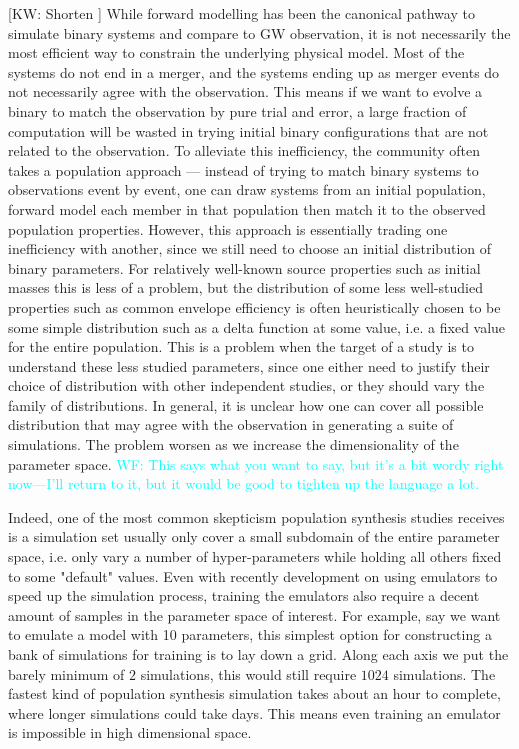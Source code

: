 \documentclass[twocolumn]{aastex631}
\newcommand{\kw}[1]{{\color{rb4}[KW: #1 ]}}
\newcommand{\wf}[1]{\textcolor{cyan}{WF: #1}}
\begin{document}
\kw{Shorten}
While forward modelling has been the canonical pathway to simulate binary systems and compare to GW observation,
it is not necessarily the most efficient way to constrain the underlying physical model.
Most of the systems do not end in a merger, and the systems ending up as merger events do not necessarily agree with the observation.
This means if we want to evolve a binary to match the observation by pure trial and error, a large fraction of computation will be wasted in trying initial binary configurations that are not related to the observation.
To alleviate this inefficiency, the community often takes a population approach --- instead of trying to match binary systems to observations event by event,
one can draw systems from an initial population, forward model each member in that population then match it to the observed population properties.
However, this approach is essentially trading one inefficiency with another, since we still need to choose an initial distribution of binary parameters.
For relatively well-known source properties such as initial masses this is less of a problem,
but the distribution of some less well-studied properties such as common envelope efficiency is often heuristically chosen to be some simple distribution such as a delta function at some value, i.e. a fixed value for the entire population.
This is a problem when the target of a study is to understand these less studied parameters, since one either need to justify their choice of distribution with other independent studies,
or they should vary the family of distributions.
In general, it is unclear how one can cover all possible distribution that may agree with the observation in generating a suite of simulations.
The problem worsen as we increase the dimensionality of the parameter space.
\wf{This says what you want to say, but it's a bit wordy right now---I'll return to it, but it would be good to tighten up the language a lot.}

Indeed, one of the most common skepticism population synthesis studies receives is a simulation set usually only cover a small subdomain of the entire parameter space,
i.e. only vary a number of hyper-parameters while holding all others fixed to some "default" values.
Even with recently development on using emulators to speed up the simulation process, training the emulators also require a decent amount of samples in the parameter space of interest.
For example, say we want to emulate a model with 10 parameters, this simplest option for constructing a bank of simulations for training is to lay down a grid. Along each axis we put the barely minimum of $2$ simulations, this would still require $1024$ simulations.
The fastest kind of population synthesis simulation takes about an hour to complete, where longer simulations could take days.
This means even training an emulator is impossible in high dimensional space.
\end{document}
